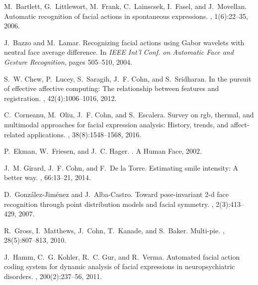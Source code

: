 \documentclass[a4paper, 10pt, conference]{ieeeconf}      \usepackage{FG2017}
\begin{document}

\begin{thebibliography}{10}

M.~Bartlett, G.~Littlewort, M.~Frank, C.~Lainscsek, I.~Fasel, and J.~Movellan.
\newblock Automatic recognition of facial actions in spontaneous expressions.
, 1(6):22--35, 2006.

J.~Bazzo and M.~Lamar.
\newblock Recognizing facial actions using {G}abor wavelets with neutral face
  average difference.
\newblock In {\em IEEE Int'l Conf. on Automatic Face and Gesture Recognition},
  pages 505--510, 2004.

S.~W. Chew, P.~Lucey, S.~Saragih, J.~F. Cohn, and S.~Sridharan.
\newblock In the pursuit of effective affective computing: The relationship
  between features and registration.
,
  42(4):1006--1016, 2012.

C.~Corneanu, M.~Oliu, J.~F. Cohn, and S.~Escalera.
\newblock Survey on rgb, thermal, and multimodal approaches for facial
  expression analysis: History, trends, and affect-related applications.
,
  38(8):1548--1568, 2016.

P.~Ekman, W.~Friesen, and J.~C. Hager.
.
\newblock A Human Face, 2002.

J.~M. Girard, J.~F. Cohn, and F.~{De la Torre}.
\newblock Estimating smile intensity: A better way.
, 66:13--21, 2014.

D.~Gonz\'alez-Jim\'enez and J.~Alba-Castro.
\newblock Toward pose-invariant 2-d face recognition through point distribution
  models and facial symmetry.
, 2(3):413--429,
  2007.

R.~Gross, I.~Matthews, J.~Cohn, T.~Kanade, and S.~Baker.
\newblock Multi-pie.
, 28(5):807--813, 2010.

J.~Hamm, C.~G. Kohler, R.~C. Gur, and R.~Verma.
\newblock Automated facial action coding system for dynamic analysis of facial
  expressions in neuropsychiatric disorders.
, 200(2):237--56, 2011.


\end{thebibliography}
\end{document}
